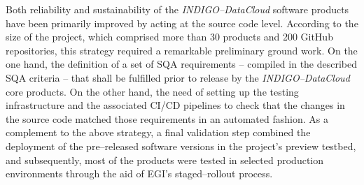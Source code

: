 
Both reliability and sustainability of the {\sl INDIGO--DataCloud} software products 
have been primarily improved by acting at the source code level. According to the 
size of the project, which comprised more than 30 products and 200 GitHub repositories, 
this strategy required a remarkable preliminary ground work. On the one hand, the 
definition of a set of SQA requirements -- compiled in the described SQA criteria 
-- that shall be fulfilled prior to release by the {\sl INDIGO--DataCloud} core 
products. On the other hand, the need of setting up the testing infrastructure and
the associated CI/CD pipelines to check that the changes in the source code matched 
those requirements in an automated fashion. As a complement to the above strategy, a 
final validation step combined the deployment of the pre--released software versions 
in the project's preview testbed, and subsequently, most of the products were tested
in selected production environments through the aid of EGI's staged--rollout process.


